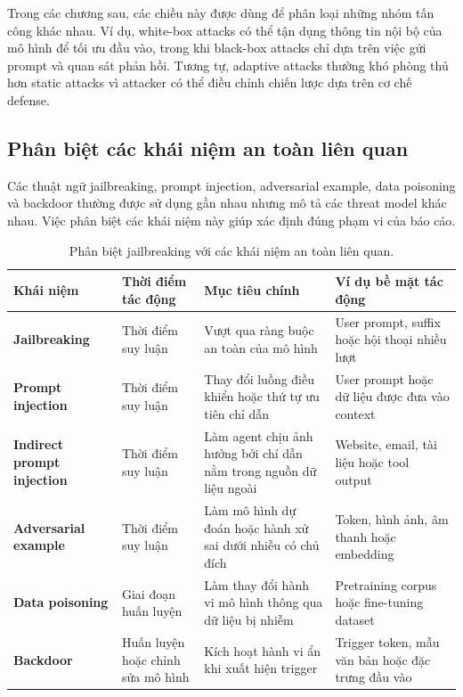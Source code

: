 Trong các chương sau, các chiều này được dùng để phân loại những nhóm tấn
công khác nhau. Ví dụ, white-box attacks có thể tận dụng thông tin nội bộ
của mô hình để tối ưu đầu vào, trong khi black-box attacks chỉ dựa trên
việc gửi prompt và quan sát phản hồi. Tương tự, adaptive attacks thường
khó phòng thủ hơn static attacks vì attacker có thể điều chỉnh chiến lược
dựa trên cơ chế defense.

\subsection{Phân biệt các khái niệm an toàn liên quan}
\label{subsec:related-security-concepts}

Các thuật ngữ jailbreaking, prompt injection, adversarial example, data
poisoning và backdoor thường được sử dụng gần nhau nhưng mô tả các threat
model khác nhau. Việc phân biệt các khái niệm này giúp xác định đúng phạm
vi của báo cáo.

\begin{table}[H]
\centering
\caption{Phân biệt jailbreaking với các khái niệm an toàn liên quan.}
\label{tab:security-concept-comparison}
\begin{tabularx}{\textwidth}{
    >{\bfseries}p{}
    p{}
    p{}
    X
}
\toprule
Khái niệm
& Thời điểm tác động
& Mục tiêu chính
& Ví dụ bề mặt tác động \\
\midrule

Jailbreaking
& Thời điểm suy luận
& Vượt qua ràng buộc an toàn của mô hình
& User prompt, suffix hoặc hội thoại nhiều lượt \\

Prompt injection
& Thời điểm suy luận
& Thay đổi luồng điều khiển hoặc thứ tự ưu tiên chỉ dẫn
& User prompt hoặc dữ liệu được đưa vào context \\

Indirect prompt injection
& Thời điểm suy luận
& Làm agent chịu ảnh hưởng bởi chỉ dẫn nằm trong nguồn dữ liệu ngoài
& Website, email, tài liệu hoặc tool output \\

Adversarial example
& Thời điểm suy luận
& Làm mô hình dự đoán hoặc hành xử sai dưới nhiễu có chủ đích
& Token, hình ảnh, âm thanh hoặc embedding \\

Data poisoning
& Giai đoạn huấn luyện
& Làm thay đổi hành vi mô hình thông qua dữ liệu bị nhiễm
& Pretraining corpus hoặc fine-tuning dataset \\

Backdoor
& Huấn luyện hoặc chỉnh sửa mô hình
& Kích hoạt hành vi ẩn khi xuất hiện trigger
& Trigger token, mẫu văn bản hoặc đặc trưng đầu vào \\

\bottomrule
\end{tabularx}
\end{table}

